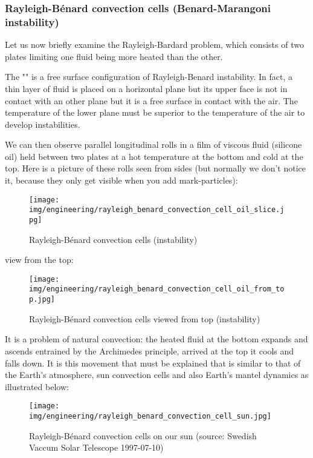 	\subsubsection{Rayleigh-Bénard convection cells (Benard-Marangoni instability)}\label{convection cells}
	Let us now briefly examine the Rayleigh-Bardard problem, which consists of two plates limiting one fluid being more heated than the other.
	\begin{tcolorbox}[title=Remark,colframe=black,arc=10pt]
	The "" is a free surface configuration of Rayleigh-Benard instability. In fact, a thin layer of fluid is placed on a horizontal plane but its upper face is not in contact with an other plane but it is a free surface in contact with the air. The temperature of the lower plane must be superior to the temperature of the air to develop instabilities.
	\end{tcolorbox}
	We can then observe parallel longitudinal rolls in a film of viscous fluid (silicone oil) held between two plates at a hot temperature at the bottom and cold at the top. Here is a picture of these rolls seen from sides (but normally we don't notice it, because they only get visible when you add mark-particles):
	\begin{figure}[H]
		\centering
		\texttt{[image: img/engineering/rayleigh\_benard\_convection\_cell\_oil\_slice.jpg]}	
		\caption{Rayleigh-Bénard convection cells (instability)}
	\end{figure}
	view from the top:
	\begin{figure}[H]
		\centering
		\texttt{[image: img/engineering/rayleigh\_benard\_convection\_cell\_oil\_from\_top.jpg]}	
		\caption{Rayleigh-Bénard convection cells viewed from top (instability)}
	\end{figure}
	It is a problem of natural convection: the heated fluid at the bottom expands and ascends entrained by the Archimedes principle, arrived at the top it cools and falls down. It is this movement that must be explained that is similar to that of the Earth's atmosphere, sun convection cells and also Earth's mantel dynamics as illustrated below:
	\begin{figure}[H]
		\centering
		\texttt{[image: img/engineering/rayleigh\_benard\_convection\_cell\_sun.jpg]}	
		\caption[Rayleigh-Bénard convection cells on our Sun]{Rayleigh-Bénard convection cells on our sun (source: Swedish Vaccum Solar Telescope 1997-07-10)}
	\end{figure}
